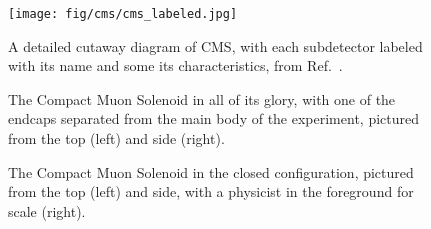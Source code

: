 \begin{figure}[htb]
    \centering
    \texttt{[image: fig/cms/cms\_labeled.jpg]}
    \caption{
        A detailed cutaway diagram of CMS, with each subdetector labeled with its name and some its characteristics, from Ref.~\cite{Sakuma:2665537}. 
    }
    \label{fig:cms_labeled}
\end{figure}

\begin{figure}[htb]
    \centering
    \quad
    \caption{
        The Compact Muon Solenoid in all of its glory, with one of the endcaps separated from the main body of the experiment, pictured from the top (left) and side (right). 
    }
    \label{fig:cms_pics}
\end{figure}

\begin{figure}[htb]
    \centering
    \quad
    \caption{
        The Compact Muon Solenoid in the closed configuration, pictured from the top (left) and side, with a physicist in the foreground for scale (right).
    }
    \label{fig:cms_jguiang}
\end{figure}

